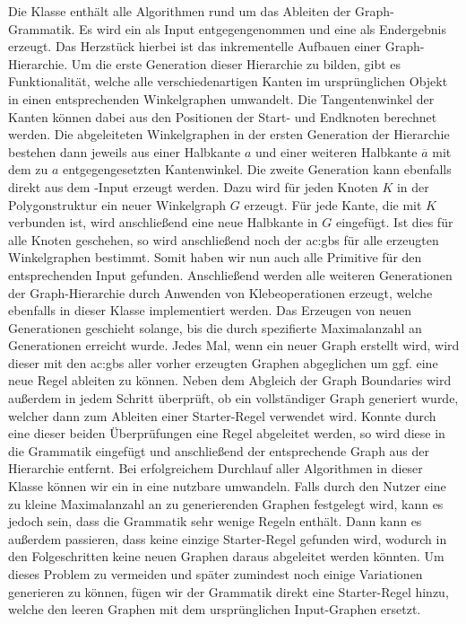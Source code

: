 Die  Klasse enthält alle Algorithmen rund um das Ableiten der Graph-Grammatik. Es wird ein  als
Input entgegengenommen und eine  als Endergebnis erzeugt. Das Herzstück hierbei ist das inkrementelle Aufbauen einer
Graph-Hierarchie. Um die erste Generation dieser Hierarchie zu bilden, gibt es Funktionalität, welche alle verschiedenartigen
Kanten im ursprünglichen  Objekt in einen entsprechenden Winkelgraphen umwandelt. Die Tangentenwinkel der Kanten
können dabei aus den Positionen der Start- und Endknoten berechnet werden. Die abgeleiteten Winkelgraphen in der ersten Generation der
Hierarchie bestehen dann jeweils aus einer Halbkante \(a\) und einer weiteren Halbkante \(\overline{a}\) mit dem zu \(a\) entgegengesetzten
Kantenwinkel. Die zweite Generation kann ebenfalls direkt aus dem -Input erzeugt werden. Dazu wird für jeden Knoten \(K\)
in der Polygonstruktur ein neuer Winkelgraph \(G\) erzeugt. Für jede Kante, die mit \(K\) verbunden ist, wird anschließend eine neue
Halbkante in \(G\) eingefügt. Ist dies für alle Knoten geschehen, so wird anschließend noch der \gls{ac:gbs} für alle erzeugten
Winkelgraphen bestimmt. Somit haben wir nun auch alle Primitive für den entsprechenden Input gefunden. Anschließend werden alle weiteren
Generationen der Graph-Hierarchie durch Anwenden von Klebeoperationen erzeugt, welche ebenfalls in dieser Klasse implementiert werden.
Das Erzeugen von neuen Generationen geschieht solange, bis die durch  spezifierte Maximalanzahl an Generationen erreicht
wurde. Jedes Mal, wenn ein neuer Graph erstellt wird, wird dieser mit den \gls{ac:gbs} aller vorher erzeugten Graphen abgeglichen um ggf.
eine neue Regel ableiten zu können. Neben dem Abgleich der Graph Boundaries
wird außerdem in jedem Schritt überprüft, ob ein vollständiger Graph generiert wurde, welcher dann zum Ableiten einer Starter-Regel
verwendet wird. Konnte durch eine dieser beiden Überprüfungen eine Regel abgeleitet werden, so wird diese in die Grammatik eingefügt
und anschließend der entsprechende Graph aus der Hierarchie entfernt. Bei erfolgreichem Durchlauf aller Algorithmen in dieser Klasse
können wir ein  in eine nutzbare  umwandeln. Falls durch den Nutzer eine zu kleine Maximalanzahl
an zu generierenden Graphen festgelegt wird, kann es jedoch sein, dass die Grammatik sehr wenige Regeln enthält. Dann kann es außerdem
passieren, dass keine einzige Starter-Regel gefunden wird, wodurch in den Folgeschritten keine neuen Graphen daraus abgeleitet werden
könnten. Um dieses Problem zu vermeiden und später zumindest noch einige Variationen generieren zu können, fügen wir der Grammatik
direkt eine Starter-Regel hinzu, welche den leeren Graphen mit dem ursprünglichen Input-Graphen ersetzt.

